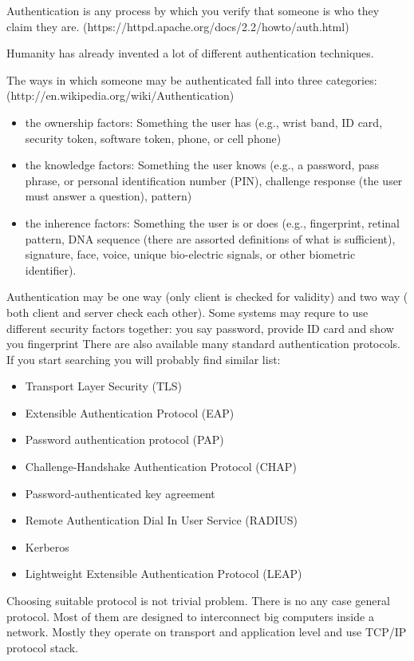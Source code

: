 Authentication is any process by which you verify that someone is who they claim
they are. (https://httpd.apache.org/docs/2.2/howto/auth.html)

Humanity has already invented a lot of different authentication techniques. 

The ways in which someone may be authenticated fall into three
categories: (http://en.wikipedia.org/wiki/Authentication)
\begin{itemize}
  \item the ownership factors: Something the user has (e.g., wrist band, ID
  card, security token, software token, phone, or cell phone)
  \item the knowledge factors: Something the user knows (e.g., a password, pass
  phrase, or personal identification number (PIN), challenge response (the user must answer a question), pattern)
  \item the inherence factors: Something the user is or does (e.g., fingerprint,
  retinal pattern, DNA sequence (there are assorted definitions of what is sufficient), signature, face, voice, unique bio-electric signals, or other biometric identifier).
\end{itemize}

Authentication may be one way (only client is checked for validity) and two way
( both client and server check each other). Some systems  may requre to use
different security factors together: you say password, provide ID card and show
you fingerprint There are also available many standard authentication protocols.
If you start searching you will probably find similar list:
\begin{itemize}
  \item Transport Layer Security (TLS)
  \item Extensible Authentication Protocol (EAP)
  \item Password authentication protocol (PAP)
  \item Challenge-Handshake Authentication Protocol (CHAP)
  \item Password-authenticated key agreement
  \item Remote Authentication Dial In User Service (RADIUS)
  \item Kerberos
  \item Lightweight Extensible Authentication Protocol (LEAP)  
\end{itemize}

Choosing suitable protocol is not trivial problem. There is no any case general
protocol.  Most of them are designed to interconnect big computers inside a
network. Mostly they operate on transport and application level and use TCP/IP
protocol stack.

